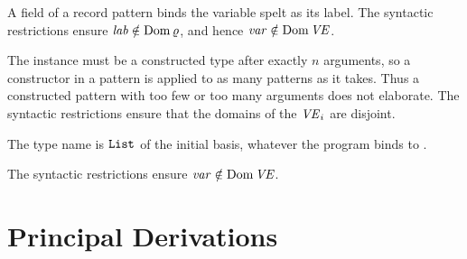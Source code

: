 

\begin{rulecomments}
 A field of a record pattern binds the variable spelt as its
label. The syntactic restrictions ensure $\mathit{lab} \notin \mathrm{Dom}\,\varrho$, and hence
$\mathit{var} \notin \mathrm{Dom}\,\mathit{VE}$.
\end{rulecomments}






\begin{rulecomments}
 The instance must be a constructed type after exactly $n$
arguments, so a constructor in a pattern is applied to as many patterns as it
takes. Thus a constructed pattern with too few or too many arguments does not
elaborate. The syntactic restrictions ensure that the domains of the $\mathit{VE}_i$
are disjoint. %

 The type name is $\mathtt{List}$ of the initial basis, whatever
the program binds to .

 The syntactic restrictions ensure $\mathit{var} \notin \mathrm{Dom}\,\mathit{VE}$.
\end{rulecomments}

\section{Principal Derivations}\label{sec:static-core-principal}


